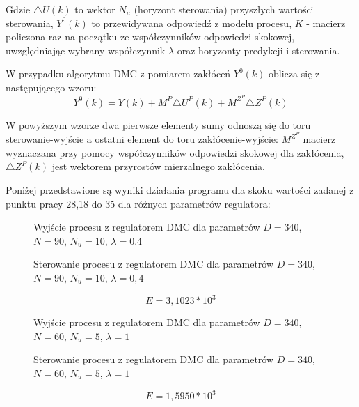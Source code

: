 Gdzie $\triangle U(k)$ to wektor $N_u$ (horyzont sterowania) przyszłych wartości sterowania, $Y^0(k)$ to przewidywana odpowiedź z modelu procesu, $K$ - macierz policzona raz na początku ze współczynników odpowiedzi skokowej, uwzględniając wybrany współczynnik $\lambda$ oraz horyzonty predykcji i sterowania.

W przypadku algorytmu DMC z pomiarem zakłóceń $Y^0(k)$ oblicza się z następującego wzoru:
\begin{equation}
Y^0(k)=Y(k)+M^P \triangle U^P(k)+M^{Z^P}\triangle Z^P(k)
\end{equation}

W powyższym wzorze dwa pierwsze elementy sumy odnoszą się do toru sterowanie-wyjście a ostatni element do toru zakłócenie-wyjście: $M^{Z^P}$ macierz wyznaczana przy pomocy współczynników odpowiedzi skokowej dla zakłócenia, $\triangle Z^P(k)$ jest wektorem przyrostów mierzalnego zakłócenia.

Poniżej przedstawione są wyniki działania programu dla skoku wartości zadanej z punktu pracy 28,18 do 35 dla różnych parametrów regulatora:

\begin{figure}[H]
\centering

\caption{Wyjście procesu z regulatorem DMC dla parametrów $D = 340$, $ N = 90$, $N_u = 10$,  $\lambda = 0.4$}
\end{figure}

\begin{figure}[H]
\centering

\caption{Sterowanie procesu z regulatorem DMC dla parametrów $D = 340$, $ N = 90$, $N_u = 10$,  $\lambda = 0,4$}
\end{figure}

\begin{equation}
E = 3,1023 * 10^3
\end{equation}

\begin{figure}[H]
\centering

\caption{Wyjście procesu z regulatorem DMC dla parametrów $D = 340$, $ N = 60$, $N_u = 5$,  $\lambda = 1$}
\end{figure}

\begin{figure}[H]
\centering

\caption{Sterowanie procesu z regulatorem DMC dla parametrów $D = 340$, $ N = 60$, $N_u = 5$,  $\lambda = 1$}
\end{figure}

\begin{equation}
E = 1,5950 * 10^3
\end{equation}

